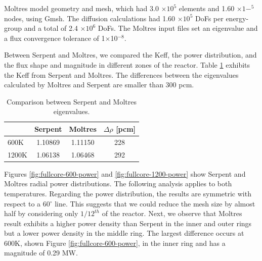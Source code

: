 Moltres model geometry and mesh, which had 3.0 $\times 10^5$ elements and 1.60 $\times 1-^5$ nodes, using Gmsh.
The diffusion calculations had 1.60 $\times 10^5$ \glspl{DoF} per energy-group and a total of 2.4 $\times 10^6$ DoFs.
The Moltres input files set an eigenvalue and a flux convergence tolerance of 1$\times$10$^{-8}$.

Between Serpent and Moltres, we compared the \gls{Keff}, the power distribution, and the flux shape and magnitude in different zones of the reactor.
Table \ref{tab:full-keff} exhibits the \gls{Keff} from Serpent and Moltres.
The differences between the eigenvalues calculated by Moltres and Serpent are smaller than 300 pcm.

\begin{table}[htbp!]
  \centering
  \caption{Comparison between Serpent and Moltres eigenvalues.}
  \begin{tabular}{lccc}
  \toprule
              & Serpent			& Moltres  & $\Delta \rho$ [pcm] 	\\
  \midrule
			 600K  	& 1.10869     & 1.11150	 &	228		\\
			1200K 	& 1.06138     & 1.06468	 &	292   \\

  \bottomrule
  \end{tabular}
  \label{tab:full-keff}
\end{table}

Figures \ref{fig:fullcore-600-power} and \ref{fig:fullcore-1200-power} show Serpent and Moltres radial power distributions.
The following analysis applies to both temperatures.
Regarding the power distribution, the results are symmetric with respect to a 60$^{\circ}$ line.
This suggests that we could reduce the mesh size by almost half by considering only $1/12^{th}$ of the reactor.
Next, we observe that Moltres result exhibits a higher power density than Serpent in the inner and outer rings but a lower power density in the middle ring.
The largest difference occurs at 600K, shown Figure \ref{fig:fullcore-600-power}, in the inner ring and has a magnitude of 0.29 MW.

